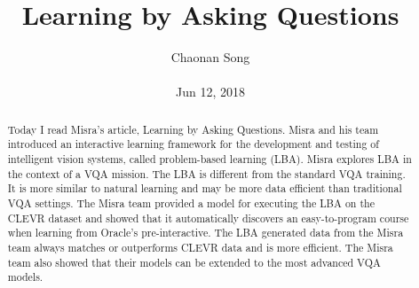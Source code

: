 \documentclass[10pt,twocolumn,letterpaper]{article}
\author{Chaonan Song \\\\
Jun 12, 2018}
\title{Learning by Asking Questions}
\begin{document}
    \maketitle
        \begin{abstract}
       Today I read Misra's article, Learning by Asking Questions. Misra and his team introduced an interactive learning framework for the development and testing of intelligent vision systems, called problem-based learning (LBA). Misra explores LBA in the context of a VQA mission. The LBA is different from the standard VQA training. It is more similar to natural learning and may be more data efficient than traditional VQA settings. The Misra team provided a model for executing the LBA on the CLEVR dataset and showed that it automatically discovers an easy-to-program course when learning from Oracle's pre-interactive. The LBA generated data from the Misra team always matches or outperforms CLEVR data and is more efficient. The Misra team also showed that their models can be extended to the most advanced VQA models.
    \end{abstract}
\end{document}
